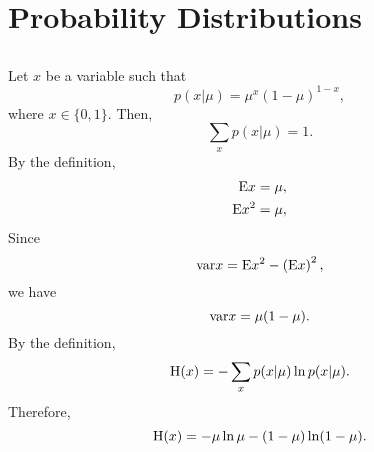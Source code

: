 \section{Probability Distributions}


\subsection{}
\label{2.1}
Let $x$ be a variable such that
%
\begin{equation}
p(x | \mu) = \mu ^ x (1 - \mu) ^ {1 - x},
\end{equation}
%
where $x \in \{ 0, 1 \}$.
Then,
%
\begin{equation}
\sum_{x} p(x | \mu) = 1.
\end{equation}
%
By the definition,
%
\begin{equation}
\begin{aligned}
{\rm E} x &= \mu, \\
{\rm E} x ^ 2 &= \mu,
\end{aligned}
\end{equation}
%
Since
%
\begin{equation}
{\rm var} x = {\rm E} x ^ 2 - \left( {\rm E} x \right) ^ 2,
\end{equation}
%
we have
%
\begin{equation}
{\rm var} x = \mu (1 - \mu).
\end{equation}
%
By the definition,
%
\begin{equation}
{\rm H} (x) = - \sum_{x} p(x | \mu) \ln p(x | \mu).
\end{equation}
%
Therefore,
%
\begin{equation}
{\rm H} (x) = - \mu \ln \mu - (1 - \mu) \ln (1 - \mu).
\end{equation}
%


